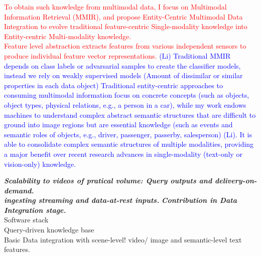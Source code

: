 \documentclass[9pt]{article}
\newcommand*\heading[1]{\large\textbf{\textit{#1.}}}
\begin{document}
\textcolor{red}{
%
To obtain such knowledge from multimodal data, I focus on Multimodal Information Retrieval (MMIR), 
and propose Entity-Centric Multimodal Data Integration to evolve traditional feature-centric Single-modality knowledge into Entity-centric Multi-modality knowledge.\\
Feature level abstraction extracts features from various independent sensors to produce individual feature vector representations.
}
%
\textcolor{blue}{
(Li) Traditional MMIR depends on class labels or advarsarial samples to create the classifier models, instead we rely on weakly supervised models (Amount of dissimilar or similar properties in each data object)
Traditional entity-centric approaches to consuming multimodal information focus on concrete concepts (such as objects, object types, physical relations, e.g., a person in a car), while my work endows machines to understand complex abstract semantic structures that are difficult to ground into image regions but are essential knowledge (such as events and semantic roles of objects, e.g., driver, passenger, passerby, salesperson) (Li).
It is able to consolidate complex semantic structures of multiple modalities, providing a major benefit over recent research advances in single-modality (text-only or vision-only) knowledge. 
}


\heading{Scalability to videos of pratical volume: Query outputs and delivery-on-demand}\\
\heading{ingesting streaming and data-at-rest inputs} 
\heading{Contribution in Data Integration stage}\\
\cite{palacios2019wip}
Software stack \\
Query-driven knowledge base \\
Basic Data integration with scene-level! video/ image and semantic-level text features.
%
%
\end{document}
